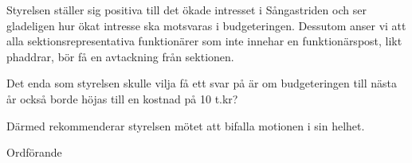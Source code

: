 \documentclass[../_main/handlingar.tex]{subfiles}
\begin{document}
\motionssvar

Styrelsen ställer sig positiva till det ökade intresset i Sångastriden och ser gladeligen hur ökat intresse ska motsvaras i budgeteringen.
Dessutom anser vi att alla sektionsrepresentativa funktionärer som inte innehar en funktionärspost, likt phaddrar, bör få en avtackning från sektionen.

Det enda som styrelsen skulle vilja få ett svar på är om budgeteringen till nästa år också borde höjas till en kostnad på 10 t.kr?

Därmed rekommenderar styrelsen mötet att bifalla motionen i sin helhet.

\begin{signatures}{1}
    \ist
    \signature{\ordf}{Ordförande}
\end{signatures}
\end{document}
